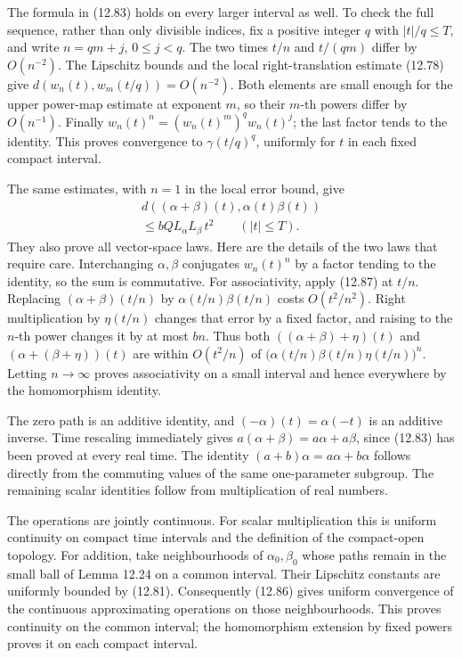\documentclass[
  11pt,
]{article}
\begin{document}
The formula in (12.83) holds on every larger interval as well. To check
the full sequence, rather than only divisible indices, fix a positive
integer \(q\) with \(|t|/q\leq T\), and write \(n=qm+j\), \(0\leq j<q\).
The two times \(t/n\) and \(t/(qm)\) differ by \(O(n^{-2})\). The
Lipschitz bounds and the local right-translation estimate (12.78) give
\(d(w_n(t),w_m(t/q))=O(n^{-2})\). Both elements are small enough for the
upper power-map estimate at exponent \(m\), so their \(m\)-th powers
differ by \(O(n^{-1})\). Finally \(w_n(t)^n=(w_n(t)^m)^q w_n(t)^j\); the
last factor tends to the identity. This proves convergence to
\(\gamma(t/q)^q\), uniformly for \(t\) in each fixed compact interval.

The same estimates, with \(n=1\) in the local error bound, give \[
\begin{gathered}
d((\alpha+\beta)(t),\alpha(t)\beta(t))\\
\leq bQL_\alpha L_\beta\,t^2
\qquad(|t|\leq T).
\end{gathered}
\tag{12.87}
\] They also prove all vector-space laws. Here are the details of the
two laws that require care. Interchanging \(\alpha,\beta\) conjugates
\(w_n(t)^n\) by a factor tending to the identity, so the sum is
commutative. For associativity, apply (12.87) at \(t/n\). Replacing
\((\alpha+\beta)(t/n)\) by \(\alpha(t/n)\beta(t/n)\) costs
\(O(t^2/n^2)\). Right multiplication by \(\eta(t/n)\) changes that error
by a fixed factor, and raising to the \(n\)-th power changes it by at
most \(bn\). Thus both \(((\alpha+\beta)+\eta)(t)\) and
\((\alpha+(\beta+\eta))(t)\) are within \(O(t^2/n)\) of
\(\bigl(\alpha(t/n)\beta(t/n)\eta(t/n)\bigr)^n\). Letting \(n\to\infty\)
proves associativity on a small interval and hence everywhere by the
homomorphism identity.

The zero path is an additive identity, and \((-\alpha)(t)=\alpha(-t)\)
is an additive inverse. Time rescaling immediately gives
\(a(\alpha+\beta)=a\alpha+a\beta\), since (12.83) has been proved at
every real time. The identity \((a+b)\alpha=a\alpha+b\alpha\) follows
directly from the commuting values of the same one-parameter subgroup.
The remaining scalar identities follow from multiplication of real
numbers.

The operations are jointly continuous. For scalar multiplication this is
uniform continuity on compact time intervals and the definition of the
compact-open topology. For addition, take neighbourhoods of
\(\alpha_0,\beta_0\) whose paths remain in the small ball of Lemma 12.24
on a common interval. Their Lipschitz constants are uniformly bounded by
(12.81). Consequently (12.86) gives uniform convergence of the
continuous approximating operations on those neighbourhoods. This proves
continuity on the common interval; the homomorphism extension by fixed
powers proves it on each compact interval.
\end{document}
